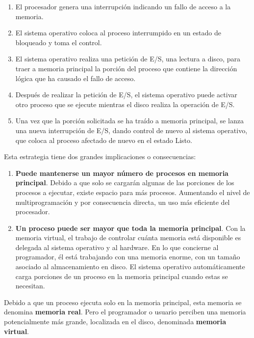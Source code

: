 \documentclass[12pt,a4paper]{article}
\begin{document}
\begin{enumerate}
    \item El procesador genera una interrupción indicando un fallo de acceso a la memoria.
    \item El sistema operativo coloca al proceso interrumpido en un estado de bloqueado y toma el control.
    \item El sistema operativo realiza una petición de E/S, una lectura a disco, para traer a memoria principal la porción del proceso que contiene la dirección lógica que ha causado el fallo de acceso.
    \item Después de realizar la petición de E/S, el sistema operativo puede activar otro proceso que se ejecute mientras el disco realiza la operación de E/S.
    \item Una vez que la porción solicitada se ha traído a memoria principal, se lanza una nueva interrupción de E/S, dando control de nuevo al sistema operativo, que coloca al proceso afectado de nuevo en el estado Listo.
\end{enumerate}
Esta estrategia tiene dos grandes implicaciones o consecuencias:
\begin{enumerate}
    \item \textbf{Puede mantenerse un mayor número de procesos en memoria principal}. Debido a que solo se cargarán algunas de las porciones de los procesos a ejecutar, existe espacio para más procesos. Aumentando el nivel de multiprogramación y por consecuencia directa, un uso más eficiente del procesador.
    \item \textbf{Un proceso puede ser mayor que toda la memoria principal}. Con la memoria virtual, el trabajo de controlar cuánta memoria está disponible es delegada al sistema operativo y al hardware. En lo que concierne al programador, él está trabajando con una memoria enorme, con un tamaño asociado al almacenamiento en disco. El sistema operativo automáticamente carga porciones de un proceso en la memoria principal cuando estas se necesitan.
\end{enumerate}
Debido a que un proceso ejecuta solo en la memoria principal, esta memoria se denomina \textbf{memoria real}. Pero el programador o usuario perciben una memoria potencialmente más grande, localizada en el disco, denominada \textbf{memoria virtual}.
\end{document}
